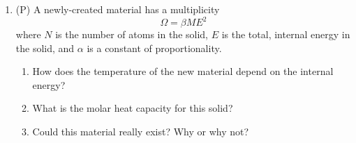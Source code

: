 \begin{enumerate}
\item (P)  A newly-created material has a multiplicity
$$
\Omega = \beta M E^2
$$
where $N$ is the number of atoms in the solid,
$E$ is the total, internal energy in the solid, and $\alpha$ is a constant of 
proportionality.
\begin{enumerate}
\item How does the temperature of the new material depend on the internal energy?
\item What is the molar heat capacity for this solid?
\item Could this material really exist? Why or why not?
\end{enumerate}


\end{enumerate}


